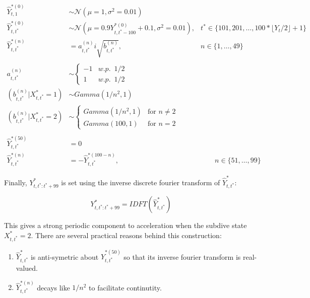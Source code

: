 \begin{enumerate}
	\begin{align*}
	\hat{Y}^{*(0)}_{t,1} &\sim \mathcal{N} \left(\mu = 1, \sigma^2 = 0.01 \right) & \\
	\hat{Y}^{*(0)}_{t,t^*} &\sim \mathcal{N} \left(\mu = 0.9 Y^{*(0)}_{t,t^*-100} + 0.1, \sigma^2 = 0.01 \right), & t^* \in \{101,201,\ldots, 100*\lfloor Y_t/2 \rfloor + 1\} \\
	\hat{Y}^{*(n)}_{t,t^*} &= a_{t,t^*}^{(n)} i\sqrt{b^{(n)}_{t,t^*}}, & n \in \{1,\ldots,49\} \\\\
	a_{t,t^*}^{(n)} &\sim  \left\{\begin{array}{lr}
	-1 & w.p. \enspace 1/2 \\
	1  & w.p. \enspace 1/2
	\end{array}\right. \\
	(b^{(n)}_{t,t^*}|X^*_{t,t^*}  = 1) &\sim Gamma(1/n^2, 1) & \\
	(b^{(n)}_{t,t^*}|X^*_{t,t^*} = 2) &\sim  \left\{\begin{array}{lr}
	Gamma(1/n^2, 1) & \text{for } n \neq 2\\
	Gamma(100,1) & \text{for } n = 2
	\end{array}\right. & \\\\
	\hat{Y}^{*(50)}_{t,t^*} &= 0 & \\
	\hat{Y}^{*(n)}_{t,t^*}  &= -\hat{Y}^{*(100-n)}_{t,t^*}, & \qquad n \in \{51,\ldots,99\}
	\end{align*}
	
	Finally, $Y^*_{t,t^*:t^*+99}$ is set using the inverse discrete fourier transform of $\hat{Y}^*_{t,t^*}$:
	
	$$Y^*_{t,t^*:t^*+99} = IDFT\left(\hat{Y}^*_{t,t^*}\right)$$
	
	This gives a strong periodic component to acceleration when the subdive state $X^*_{t,t^*}= 2$. There are several practical reasons behind this construction:

	\begin{enumerate}
		\item $\hat{Y}^*_{t,t^*}$ is anti-symetric about $\hat{Y}^{*(50)}_{t,t^*}$ so that its inverse fourier transform is real-valued.
		\item $\hat{Y}^{*(n)}_{t,t^*}$ decays like $1/n^2$ to facilitate continutity.
	\end{enumerate}
		
\end{enumerate}

